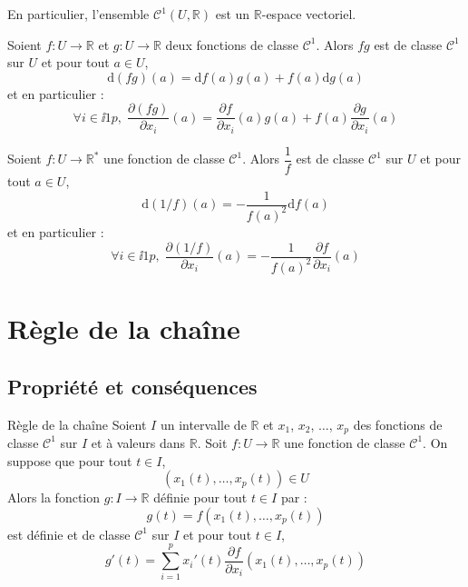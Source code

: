 \documentclass[french,11pt,twoside]{VcCours}
\begin{document}
\begin{Remarque}{} En particulier, l'ensemble $\mathcal{C}^1(U, \mathbb{R})$ est un $\mathbb{R}$-espace vectoriel.
\end{Remarque}

\begin{Proposition}{} Soient $f : U \rightarrow \mathbb{R}$ et $g :  U \rightarrow \mathbb{R}$ deux fonctions de classe $\mathcal{C}^1$. Alors $fg$ est de classe $\mathcal{C}^1$ sur $U$ et pour tout $a \in U$,
$$ \textrm{d}(fg)(a) =\textrm{d}f(a)g(a) + f(a) \textrm{d}g(a)$$
et en particulier :
$$ \forall i \in \ii{1}{p}, \; \dfrac{\partial (fg)}{\partial x_i}(a) = \dfrac{\partial f}{\partial x_i}(a) g(a) +f(a)  \dfrac{\partial g}{\partial x_i}(a)$$
\end{Proposition}

\begin{Proposition}{} Soient $f : U \rightarrow \mathbb{R}^*$ une fonction de classe $\mathcal{C}^1$. Alors $\dfrac{1}{f}$ est de classe $\mathcal{C}^1$ sur $U$ et pour tout $a \in U$,
$$\textrm{d}(1/f)(a) = - \dfrac{1}{f(a)^2} \textrm{d}f(a)$$
et en particulier :
$$ \forall i \in \ii{1}{p}, \; \dfrac{\partial (1/f)}{\partial x_i}(a) = - \dfrac{1}{f(a)^2} \dfrac{\partial f }{\partial x_i}(a)$$
\end{Proposition}



\section{Règle de la chaîne}
\subsection{Propriété et conséquences}
\begin{Theoreme}{Règle de la chaîne} Soient $I$ un intervalle de $\mathbb{R}$ et $x_1$, $x_2$, $\ldots$, $x_p$ des fonctions de classe $\mathcal{C}^1$ sur $I$ et à valeurs dans $\mathbb{R}$. Soit $f : U \rightarrow \mathbb{R}$ une fonction de classe $\mathcal{C}^1$. On suppose que pour tout $t \in I$,
$$ (x_1(t), \ldots, x_p(t)) \in U$$
Alors la fonction $g : I \rightarrow \mathbb{R}$ définie pour tout $t \in I$ par :
$$ g(t)=f(x_1(t), \ldots, x_p(t))$$
est définie et de classe $\mathcal{C}^1$ sur $I$ et pour tout $t \in I$,
$$ g'(t) = \sum_{i=1}^p x_i'(t) \dfrac{\partial f}{\partial x_i}(x_1(t), \ldots, x_p(t))$$
\end{Theoreme}

\medskip
\end{document}
